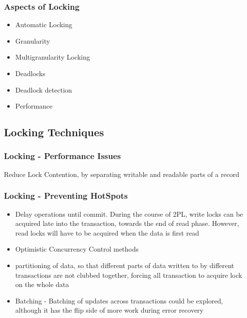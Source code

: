 \documentclass[12]{beamer}
\begin{document}
\begin{frame}
  \frametitle{Aspects of Locking}
  \begin{itemize}
	\item Automatic Locking
	\item Granularity
	\item Multigranularity Locking
	\item Deadlocks
	\item Deadlock detection
	\item Performance
  \end{itemize}
\end{frame}

\subsection{Locking Techniques}

\begin{frame}
	\frametitle{Locking - Performance Issues}
  Reduce Lock Contention, by separating writable and readable parts of a record
\end{frame}

\begin{frame}
\frametitle{Locking - Preventing HotSpots}
\begin{itemize}
\item Delay operations until commit. During the course of 2PL, write locks can be acquired late into the transaction, towards the end of read phase. However, read locks will have to be acquired when the data is first read
\item Optimistic Concurrency Control methods
\item partitioning of data, so that different parts of data written to by different transactions are not clubbed together, forcing all transaction to acquire lock on the whole data
\item Batching - Batching of updates across transactions could be explored, although it has the flip side of more work during error recovery
\end{itemize}
\end{frame}
\end{document}
